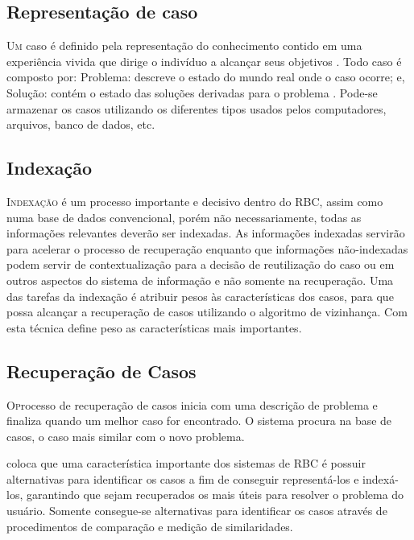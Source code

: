 \subsection{Representação de caso}
\lettrine{U}{m} caso é definido pela representação do conhecimento contido em uma experiência vivida que dirige o indivíduo a alcançar seus objetivos \cite{leakecase}. Todo caso é composto por: Problema: descreve o estado do mundo real onde o caso ocorre; e, Solução: contém o estado das soluções derivadas para o problema \cite{watson1998applying}. Pode-se armazenar os casos utilizando os diferentes tipos usados pelos computadores, arquivos, banco de dados, etc.

\subsection{Indexação}
\lettrine{I}{ndexação} é um processo importante e decisivo dentro do RBC, assim como numa base de dados convencional, porém não necessariamente, todas as informações relevantes deverão ser indexadas. As informações indexadas servirão para acelerar o processo de recuperação enquanto que informações não-indexadas podem servir de contextualização para a decisão de reutilização do caso ou em outros aspectos do sistema de informação e não somente na recuperação. \cite{vitorino2009raciocinio} Uma das tarefas da indexação é atribuir pesos às características dos casos, para que possa alcançar a recuperação de casos utilizando o algoritmo de vizinhança. Com esta técnica define peso as características mais importantes.

\subsection{Recuperação de Casos}
\lettrine{O} processo de recuperação de casos \cite{Riesbeck} inicia com uma descrição de problema e finaliza quando um melhor caso for encontrado. O sistema procura na base de casos, o caso mais similar com o novo problema.

\cite{leakecase} coloca que uma característica importante dos sistemas de RBC é possuir alternativas para identificar os casos a fim de conseguir representá-los e indexá-los, garantindo que sejam recuperados os mais úteis para resolver o problema do usuário. Somente consegue-se alternativas para identificar os casos através de procedimentos de comparação e medição de similaridades.

